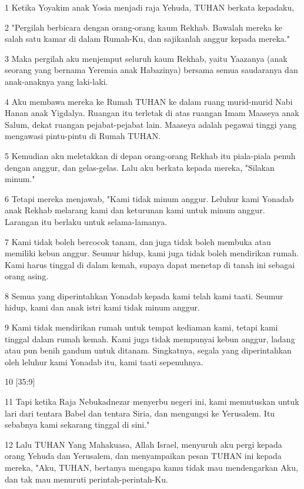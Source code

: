 \par 1 Ketika Yoyakim anak Yosia menjadi raja Yehuda, TUHAN berkata kepadaku,
\par 2 "Pergilah berbicara dengan orang-orang kaum Rekhab. Bawalah mereka ke salah satu kamar di dalam Rumah-Ku, dan sajikanlah anggur kepada mereka."
\par 3 Maka pergilah aku menjemput seluruh kaum Rekhab, yaitu Yaazanya (anak seorang yang bernama Yeremia anak Habazinya) bersama semua saudaranya dan anak-anaknya yang laki-laki.
\par 4 Aku membawa mereka ke Rumah TUHAN ke dalam ruang murid-murid Nabi Hanan anak Yigdalya. Ruangan itu terletak di atas ruangan Imam Maaseya anak Salum, dekat ruangan pejabat-pejabat lain. Maaseya adalah pegawai tinggi yang mengawasi pintu-pintu di Rumah TUHAN.
\par 5 Kemudian aku meletakkan di depan orang-orang Rekhab itu piala-piala penuh dengan anggur, dan gelas-gelas. Lalu aku berkata kepada mereka, "Silakan minum."
\par 6 Tetapi mereka menjawab, "Kami tidak minum anggur. Leluhur kami Yonadab anak Rekhab melarang kami dan keturunan kami untuk minum anggur. Larangan itu berlaku untuk selama-lamanya.
\par 7 Kami tidak boleh bercocok tanam, dan juga tidak boleh membuka atau memiliki kebun anggur. Seumur hidup, kami juga tidak boleh mendirikan rumah. Kami harus tinggal di dalam kemah, supaya dapat menetap di tanah ini sebagai orang asing.
\par 8 Semua yang diperintahkan Yonadab kepada kami telah kami taati. Seumur hidup, kami dan anak istri kami tidak minum anggur.
\par 9 Kami tidak mendirikan rumah untuk tempat kediaman kami, tetapi kami tinggal dalam rumah kemah. Kami juga tidak mempunyai kebun anggur, ladang atau pun benih gandum untuk ditanam. Singkatnya, segala yang diperintahkan oleh leluhur kami Yonadab itu, kami taati sepenuhnya.
\par 10 [35:9]
\par 11 Tapi ketika Raja Nebukadnezar menyerbu negeri ini, kami memutuskan untuk lari dari tentara Babel dan tentara Siria, dan mengungsi ke Yerusalem. Itu sebabnya kami sekarang tinggal di sini."
\par 12 Lalu TUHAN Yang Mahakuasa, Allah Israel, menyuruh aku pergi kepada orang Yehuda dan Yerusalem, dan menyampaikan pesan TUHAN ini kepada mereka, "Aku, TUHAN, bertanya mengapa kamu tidak mau mendengarkan Aku, dan tak mau menuruti perintah-perintah-Ku.
